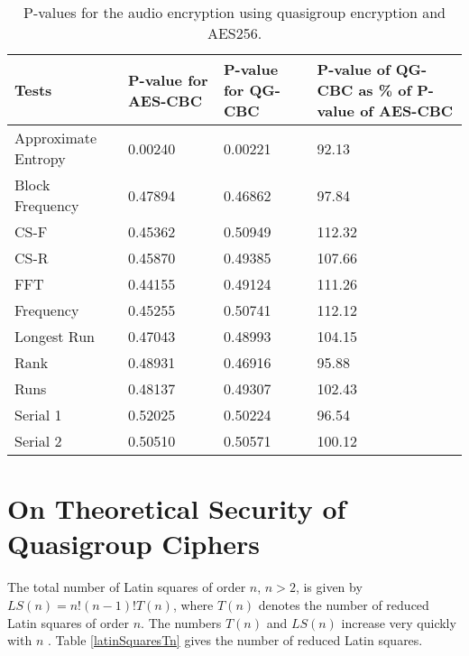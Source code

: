 \documentclass[conference]{IEEEtran}
\begin{document}
\begin{table}
\centering
\begin{tabular}{|p{2cm}|p{1.5cm}|p{1.5cm}|p{2cm}|}
\hline
Tests& P-value for AES-CBC&  P-value for QG-CBC& P-value of QG-CBC as \% of P-value of AES-CBC\\ \hline
Approximate Entropy& 0.00240& 0.00221& 92.13\\ \hline
Block Frequency& 0.47894&  0.46862& 97.84\\ \hline
CS-F& 0.45362&  0.50949& 112.32\\ \hline
CS-R& 0.45870&  0.49385& 107.66\\ \hline
FFT& 0.44155& 0.49124& 111.26\\ \hline
Frequency& 0.45255&  0.50741&  112.12\\ \hline
Longest Run& 0.47043&  0.48993&  104.15\\ \hline
Rank& 0.48931& 0.46916& 95.88\\ \hline
Runs& 0.48137& 0.49307& 102.43\\ \hline
Serial 1& 0.52025& 0.50224& 96.54\\ \hline
Serial 2& 0.50510& 0.50571& 100.12\\ \hline
\end{tabular}
\caption{P-values for the audio encryption using quasigroup encryption and AES256.}
\label{audio_tests}
\end{table}

\section{On Theoretical Security of Quasigroup Ciphers}
The total number of Latin squares of order $n$, $n>2$, is given by $LS(n)=n!(n-1)!T(n)$, where $T(n)$ denotes the number of reduced Latin squares of order $n$. The numbers $T(n)$ and $LS(n)$ increase very quickly with $n$ \cite{Satti}. Table \ref{latinSquaresTn} gives the number of reduced Latin squares.
\end{document}
